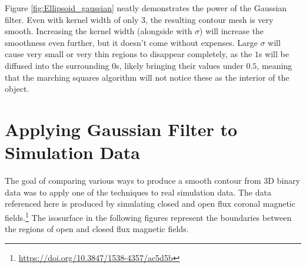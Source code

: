 \documentclass[a4paper,10pt]{report}
\begin{document}
Figure \ref{fig:Ellipsoid_gaussian} neatly demonstrates the power of the Gaussian filter. Even with kernel width of only $3$, the resulting contour mesh is very smooth. Increasing the kernel width (alongside with $\sigma$) will increase the smoothness even further, but it doesn't come without expenses. Large $\sigma$ will cause very small or very thin regions to disappear completely, as the $1$s will be diffused into the surrounding $0$s, likely bringing their values under $0.5$, meaning that the marching squares algorithm will not notice these as the interior of the object.

\section{Applying Gaussian Filter to Simulation Data}\label{sec:simulation}
The goal of comparing various ways to produce a smooth contour from 3D binary data was to apply one of the techniques to real simulation data. The data referenced here is produced by simulating closed and open flux coronal magnetic fields.\footnote{\url{https://doi.org/10.3847/1538-4357/ac5d5b}} The isosurface in the following figures represent the boundaries between the regions of open and closed flux magnetic fields.
\end{document}
